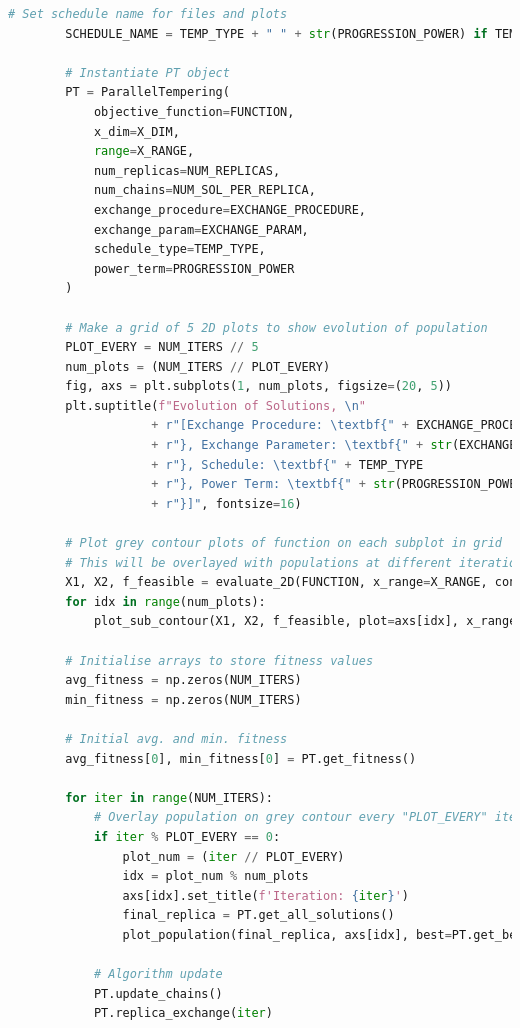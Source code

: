 \documentclass[10pt]{article}
\begin{document}
\begin{lstlisting}[language=Python, caption=PT\_TuningExperiments.py, label=PT_TuningExperimentspy]
        # Set schedule name for files and plots
        SCHEDULE_NAME = TEMP_TYPE + " " + str(PROGRESSION_POWER) if TEMP_TYPE == 'Power' else TEMP_TYPE
    
        # Instantiate PT object
        PT = ParallelTempering(
            objective_function=FUNCTION,
            x_dim=X_DIM,
            range=X_RANGE,
            num_replicas=NUM_REPLICAS,
            num_chains=NUM_SOL_PER_REPLICA,
            exchange_procedure=EXCHANGE_PROCEDURE,
            exchange_param=EXCHANGE_PARAM,
            schedule_type=TEMP_TYPE,
            power_term=PROGRESSION_POWER
        )
    
        # Make a grid of 5 2D plots to show evolution of population
        PLOT_EVERY = NUM_ITERS // 5
        num_plots = (NUM_ITERS // PLOT_EVERY)
        fig, axs = plt.subplots(1, num_plots, figsize=(20, 5))
        plt.suptitle(f"Evolution of Solutions, \n"
                    + r"[Exchange Procedure: \textbf{" + EXCHANGE_PROCEDURE
                    + r"}, Exchange Parameter: \textbf{" + str(EXCHANGE_PARAM)
                    + r"}, Schedule: \textbf{" + TEMP_TYPE
                    + r"}, Power Term: \textbf{" + str(PROGRESSION_POWER)
                    + r"}]", fontsize=16)
    
        # Plot grey contour plots of function on each subplot in grid
        # This will be overlayed with populations at different iterations
        X1, X2, f_feasible = evaluate_2D(FUNCTION, x_range=X_RANGE, constraints=True)
        for idx in range(num_plots):
            plot_sub_contour(X1, X2, f_feasible, plot=axs[idx], x_range=X_RANGE)
    
        # Initialise arrays to store fitness values
        avg_fitness = np.zeros(NUM_ITERS)
        min_fitness = np.zeros(NUM_ITERS)
    
        # Initial avg. and min. fitness
        avg_fitness[0], min_fitness[0] = PT.get_fitness()
    
        for iter in range(NUM_ITERS):
            # Overlay population on grey contour every "PLOT_EVERY" iterations. (Periodic break to allow for visualisation).
            if iter % PLOT_EVERY == 0:
                plot_num = (iter // PLOT_EVERY)
                idx = plot_num % num_plots
                axs[idx].set_title(f'Iteration: {iter}')
                final_replica = PT.get_all_solutions()
                plot_population(final_replica, axs[idx], best=PT.get_best_solution(), last=final_replica[-1])
    
            # Algorithm update
            PT.update_chains()
            PT.replica_exchange(iter)
    

\end{lstlisting}
\end{document}
